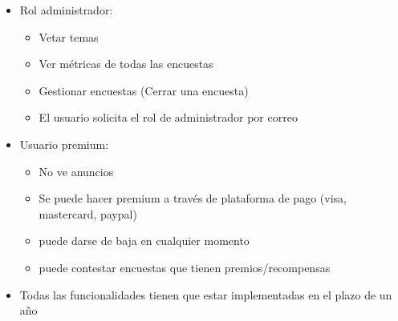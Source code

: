 \documentclass{article}
\begin{document}
\begin{itemize}
        \item Rol administrador:
        \begin{itemize}
            \item Vetar temas
            \item Ver métricas de todas las encuestas
            \item Gestionar encuestas (Cerrar una encuesta)
            \item El usuario solicita el rol de administrador por correo
        \end{itemize}
        \item Usuario premium:
        \begin{itemize}
            \item No ve anuncios
            \item Se puede hacer premium a través de plataforma de pago
            (visa, mastercard, paypal)
            \item puede darse de baja en cualquier momento
            \item puede contestar encuestas que tienen premios/recompensas
        \end{itemize}
        \item Todas las funcionalidades tienen que estar implementadas en el
        plazo de un año
	\end{itemize}
\end{document}
